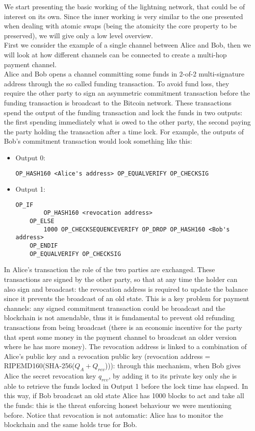 We start presenting the basic working of the lightning network, that could be of interest on its own. Since the inner working is very similar to the one presented when dealing with atomic swaps (being the atomicity the core property to be preserved), we will give only a low level overview.
\\
First we consider the example of a single channel between Alice and Bob, then we will look at how different channels can be connected to create a multi-hop payment channel.
\\
Alice and Bob opens a channel committing some funds in 2-of-2 multi-signature address through the so called funding transaction. To avoid fund loss, they require the other party to sign an asymmetric commitment transaction before the funding transaction is broadcast to the Bitcoin network. These transactions spend the output of the funding transaction and lock the funds in two outputs: the first spending immediately what is owed to the other party, the second paying the party holding the transaction after a time lock. For example, the outputs of Bob's commitment transaction would look something like this:
\begin{itemize}
\item Output 0:
	\begin{lstlisting}[frame=single]
	OP_HASH160 <Alice's address> OP_EQUALVERIFY OP_CHECKSIG\end{lstlisting}
	
\item Output 1:
	\begin{lstlisting}[frame=single]
	OP_IF
		OP_HASH160 <revocation address>
	OP_ELSE
		1000 OP_CHECKSEQUENCEVERIFY OP_DROP OP_HASH160 <Bob's address> 
	OP_ENDIF
	OP_EQUALVERIFY OP_CHECKSIG\end{lstlisting}
\end{itemize}
In Alice's transaction the role of the two parties are exchanged. These transactions are signed by the other party, so that at any time the holder can also sign and broadcast: the revocation address is required to update the balance since it prevents the broadcast of an old state. This is a key problem for payment channels: any signed commitment transaction could be broadcast and the blockchain is not amendable, thus it is fundamental to prevent old refunding transactions from being broadcast (there is an economic incentive for the party that spent some money in the payment channel to broadcast an older version where he has more money). The revocation address is linked to a combination of Alice's public key and a revocation public key (revocation address = RIPEMD160(SHA-256($Q_A + Q_{rev}$))): through this mechanism, when Bob gives Alice the secret revocation key $q_{rev}$, by adding it to its private key only she is able to retrieve the funds locked in Output 1 before the lock time has elapsed. In this way, if Bob broadcast an old state Alice has 1000 blocks to act and take all the funds: this is the threat enforcing honest behaviour we were mentioning before. Notice that revocation is not automatic: Alice has to monitor the blockchain and the same holds true for Bob.
